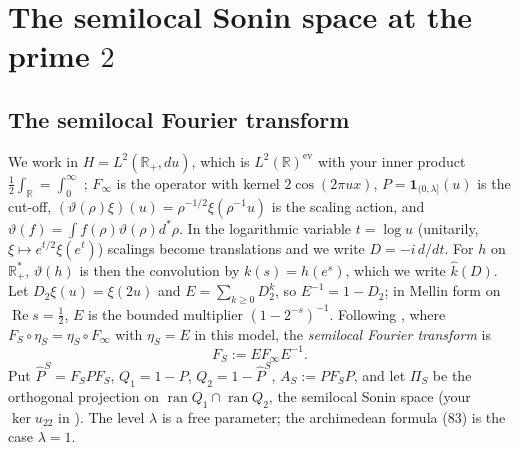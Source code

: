 \documentclass[11pt]{amsart}
\theoremstyle{definition}
\theoremstyle{remark}
\newcommand{\R}{\mathbb R}
\newcommand{\Rel}{\operatorname{Re}}
\newcommand{\ran}{\operatorname{ran}}
\newcommand{\Pih}{\widehat P}
\begin{document}
\section{The semilocal Sonin space at the prime \texorpdfstring{$2$}{2}}\label{sec:semilocal}

\subsection{The semilocal Fourier transform}
We work in $H=L^2(\R_+,du)$, which is $L^2(\R)^{\mathrm{ev}}$ with your inner product $\frac12\int_\R=\int_0^\infty$
\cite[(16)]{CC2021}; $F_\infty$ is the operator with kernel $2\cos(2\pi ux)$, $P=\mathbf 1_{(0,\lambda]}(u)$ is the cut-off,
$(\vartheta(\rho)\xi)(u)=\rho^{-1/2}\xi(\rho^{-1}u)$ is the scaling action, and $\vartheta(f)=\int f(\rho)\vartheta(\rho)d^*\rho$.
In the logarithmic variable $t=\log u$ (unitarily, $\xi\mapsto e^{t/2}\xi(e^t)$) scalings become translations and we write
$D=-i\,d/dt$. For $h$ on $\R_+^*$, $\vartheta(h)$ is then the convolution by $k(s)=h(e^s)$, which we write $\widehat k(D)$. Let $D_2\xi(u)=\xi(2u)$ and $E=\sum_{k\ge0}D_2^k$, so $E^{-1}=1-D_2$; in Mellin form on $\Rel s=\frac12$,
$E$ is the bounded multiplier $(1-2^{-s})^{-1}$. Following \cite[Prop.~4.1]{CCM2023}, where $F_S\circ\eta_S=\eta_S\circ F_\infty$
with $\eta_S=E$ in this model, the \emph{semilocal Fourier transform} is
\[
F_S:=EF_\infty E^{-1}.
\]
Put $\Pih^S=F_SPF_S$, $Q_1=1-P$, $Q_2=1-\Pih^S$, $A_S:=PF_SP$, and let $\Pi_S$ be the orthogonal projection on
$\ran Q_1\cap\ran Q_2$, the semilocal Sonin space (your $\ker u_{22}$ in \cite{CCquasi}). The level $\lambda$ is a free
parameter; the archimedean formula (83) is the case $\lambda=1$.
\end{document}
